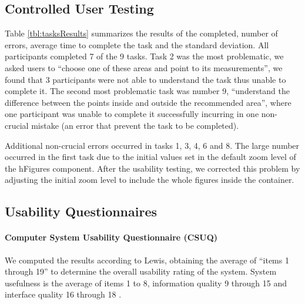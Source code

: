 \documentclass[twocolumn]{bmcart}%
\begin{document}
\subsection*{Controlled User Testing}

Table \ref{tbl:tasksResults} summarizes the results of the completed, number of errors, average time to complete the task and the standard deviation. All participants completed 7 of the 9 tasks. Task 2 was the most problematic, we asked users to ``choose one of these areas and point to its measurements'', we found that 3 participants were not able to understand the task thus unable to complete it. The second most problematic task was number 9, ``understand the difference between the points inside and outside the recommended area'', where one participant was unable to complete it successfully incurring in one non-crucial mistake (an error that prevent the task to be completed). 

Additional non-crucial errors occurred in tasks 1, 3, 4, 6 and 8. The large number occurred in the first task due to the initial values set in the default zoom level of the hFigures component. After the usability testing, we corrected this problem by adjusting the initial zoom level to include the whole figures inside the container.

\subsection*{Usability Questionnaires}

\paragraph*{Computer System Usability Questionnaire (CSUQ)}
We computed the results according to Lewis, obtaining the average of ``items 1 through 19'' to determine the overall usability rating of the system. System usefulness is the average of items 1 to 8, information quality 9 through 15 and interface quality 16 through 18 \cite{lewis2002psychometric}.
\end{document}
